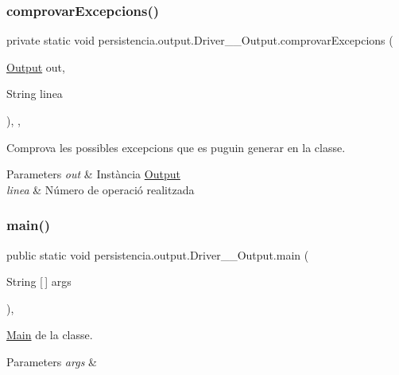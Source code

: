 \subsubsection{\texorpdfstring{comprovar\+Excepcions()}{comprovarExcepcions()}}
{\footnotesize\ttfamily private static void persistencia.\+output.\+Driver\+\_\+\+\_\+\+Output.\+comprovar\+Excepcions (\begin{DoxyParamCaption}\item[{\hyperlink{classpersistencia_1_1output_1_1Output}{Output}}]{out,  }\item[{String}]{linea }\end{DoxyParamCaption})\hspace{0.3cm}{\ttfamily [inline]}, {\ttfamily [static]}, {\ttfamily [private]}}



Comprova les possibles excepcions que es puguin generar en la classe. 


\begin{DoxyParams}{Parameters}
{\em out} & Instància \hyperlink{classpersistencia_1_1output_1_1Output}{Output} \\
\hline
{\em linea} & Número de operació realitzada \\
\hline
\end{DoxyParams}
\mbox{\label{classpersistencia_1_1output_1_1Driver____Output_a1fcfdd813a7c5460772e74b5709fc030}} 
\subsubsection{\texorpdfstring{main()}{main()}}
{\footnotesize\ttfamily public static void persistencia.\+output.\+Driver\+\_\+\+\_\+\+Output.\+main (\begin{DoxyParamCaption}\item[{String \mbox{[}$\,$\mbox{]}}]{args }\end{DoxyParamCaption})\hspace{0.3cm}{\ttfamily [inline]}, {\ttfamily [static]}}



\hyperlink{classMain}{Main} de la classe. 


\begin{DoxyParams}{Parameters}
{\em args} & \\
\hline
\end{DoxyParams}


